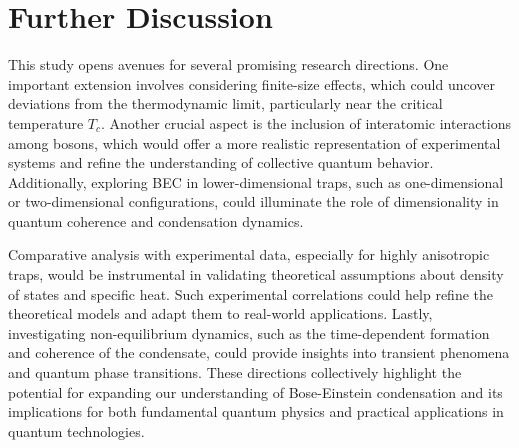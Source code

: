 \documentclass{article}
\numberwithin{equation}{section}
\numberwithin{equation}{subsection}
\begin{document}
\section{Further Discussion}

This study opens avenues for several promising research directions. One important extension involves considering finite-size effects, which could uncover deviations from the thermodynamic limit, particularly near the critical temperature \(T_c\). Another crucial aspect is the inclusion of interatomic interactions among bosons, which would offer a more realistic representation of experimental systems and refine the understanding of collective quantum behavior. Additionally, exploring BEC in lower-dimensional traps, such as one-dimensional or two-dimensional configurations, could illuminate the role of dimensionality in quantum coherence and condensation dynamics.

Comparative analysis with experimental data, especially for highly anisotropic traps, would be instrumental in validating theoretical assumptions about density of states and specific heat. Such experimental correlations could help refine the theoretical models and adapt them to real-world applications. Lastly, investigating non-equilibrium dynamics, such as the time-dependent formation and coherence of the condensate, could provide insights into transient phenomena and quantum phase transitions. These directions collectively highlight the potential for expanding our understanding of Bose-Einstein condensation and its implications for both fundamental quantum physics and practical applications in quantum technologies.
\end{document}
